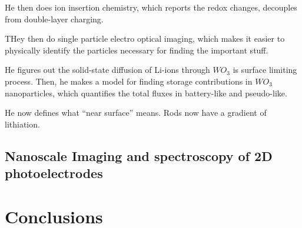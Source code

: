 \documentclass[10pt, oneside]{article}
\begin{document}
He then does ion insertion chemistry, which reports the redox changes, decouples from double-layer charging.

THey then do single particle electro optical imaging, which makes it easier to physically identify the particles necessary for finding the important stuff. 


He figures out the solid-state diffusion of Li-ions through $WO_3$ is surface limiting process. Then, he makes a model for finding storage contributions in $WO_3$ nanoparticles, which quantifies the total fluxes in battery-like and pseudo-like. 

He now defines what ``near surface'' means. Rods now have a gradient of lithiation. 



\subsection{Nanoscale Imaging and spectroscopy of 2D photoelectrodes}

\section{Conclusions}
\end{document}
